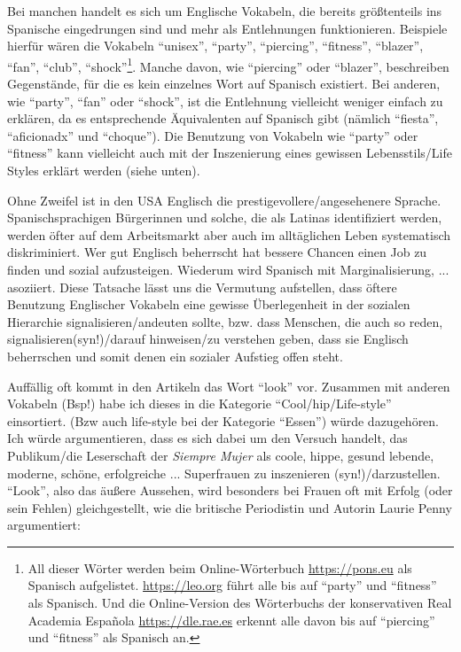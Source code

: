 Bei manchen handelt es sich um Englische Vokabeln, die bereits größtenteils ins Spanische eingedrungen sind und mehr als Entlehnungen funktionieren.
Beispiele hierfür wären die Vokabeln ``unisex'', ``party'', ``piercing'', ``fitness'', ``blazer'', ``fan'', ``club'', ``shock''\footnote{All dieser Wörter werden beim Online-Wörterbuch \url{https://pons.eu} als Spanisch aufgelistet. \url{https://leo.org} führt alle bis auf ``party'' und ``fitness'' als Spanisch. Und die Online-Version des Wörterbuchs der konservativen Real Academia Española \url{https://dle.rae.es} erkennt alle davon bis auf ``piercing'' und ``fitness'' als Spanisch an.}.
Manche davon, wie ``piercing'' oder ``blazer'', beschreiben Gegenstände, für die es kein einzelnes Wort auf Spanisch existiert.
Bei anderen, wie ``party'', ``fan'' oder ``shock'',  ist die Entlehnung vielleicht weniger einfach zu erklären, da es entsprechende Äquivalenten auf Spanisch gibt (nämlich ``fiesta'', ``aficionadx'' und ``choque''). %
Die Benutzung von Vokabeln wie ``party'' oder ``fitness'' kann vielleicht auch mit der Inszenierung eines gewissen Lebensstils/Life Styles erklärt werden (siehe unten).

Ohne Zweifel ist in den USA Englisch die prestigevollere/angesehenere Sprache.
Spanischsprachigen Bürgerinnen und solche, die als Latinas identifiziert werden, werden öfter auf dem Arbeitsmarkt aber auch im alltäglichen Leben systematisch diskriminiert.
Wer gut Englisch beherrscht hat bessere Chancen einen Job zu finden und sozial aufzusteigen.
Wiederum wird Spanisch mit Marginalisierung, ... asoziiert. %
Diese Tatsache lässt uns die Vermutung aufstellen, dass öftere Benutzung Englischer Vokabeln eine gewisse Überlegenheit in der sozialen Hierarchie signalisieren/andeuten sollte, bzw. dass Menschen, die auch so reden, signalisieren(syn!)/darauf hinweisen/zu verstehen geben, dass sie Englisch beherrschen und somit denen ein sozialer Aufstieg offen steht.

Auffällig oft kommt in den Artikeln das Wort ``look'' vor.
Zusammen mit anderen Vokabeln (Bsp!) habe ich dieses in die Kategorie ``Cool/hip/Life-style'' einsortiert.
(Bzw auch life-style bei der Kategorie ``Essen'') würde dazugehören.
Ich würde argumentieren, dass es sich dabei um den Versuch handelt, das Publikum/die Leserschaft der \textit{Siempre Mujer} als coole, hippe, gesund lebende, moderne, schöne, erfolgreiche ... Superfrauen zu inszenieren (syn!)/darzustellen.
``Look'', also das äußere Aussehen, wird besonders bei Frauen oft mit Erfolg (oder sein Fehlen) gleichgestellt, wie die britische Periodistin und Autorin Laurie Penny argumentiert:

